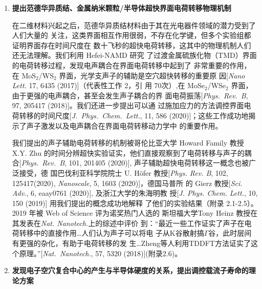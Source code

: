 \documentclass[12pt,UTF8,AutoFakeBold=3,a4paper]{article}
\newcommand{\hnamd}{Hefei-NAMD}
\begin{document}
\begin{enumerate}[label=\textnormal{\color{EmphColor}\Roman*.}]
\item {\color{EmphColor}\kaishu\bfseries{}
    提出范德华异质结、金属纳米颗粒/半导体超快界面电荷转移物理机制
}

  在二维材料兴起之后，范德华异质结材料由于其在光电器件领域的潜力受到了人们大量的
  关注，这类界面相互作用很弱，不存在化学键，但多个实验组都证明界面存在时间尺度在
  数十飞秒的超快电荷转移，这其中的物理机制人们还无法理解。我们利用 \hnamd{} 研究
  了过渡金属硫族化物（TMD）界面的电荷转移过程，发现电声耦合在界面电荷转移中起到了
  非常重要的作用，在 MoS$_2$/WS$_2$ 界面，光学支声子的辅助是空穴超快转移的重要原
  因[\textit{Nano Lett.} 17, 6435 (2017)]（代表性工作 2，引
  用 70次）,在 MoSe$_2$/WSe$_2$ 界面，由于更强的电声耦合，甚至会发生声子耦合的界
  面电荷振荡[\textit{Phys.\ Rev.\ B}, 97, 205417 (2018)]。我们还进一步提出可以通
  过施加应力的方法调控界面电荷转移的时间尺度[\textit{J.\ Phys.\ Chem.\ Lett.},
  11, 586 (2020)]；这些工作成功地揭示了声子激发以及电声耦合在界面电荷转移动力学中
  的重要作用。

  \begin{justify} \kaishu\color{magenta}{}

    我们提出的声子辅助电荷转移的机制被哥伦比亚大学 Howard Family 教授 X.Y.  Zhu
    的时间分辨超快实验证实，他们直接观察到了电荷转移与声子的耦合[\textit{Phys.\
      Rev.\ B}, 101, 201405 (2020)], 声子辅助超快电荷转移这一概念也被广泛接受，德
    国巴伐利亚科学院院士 U.  H\"ofer 教授[\textit{Phys. Rev. B}, 102,
    125417(2020), \textit{Nanoscale}, 5, 1603 (2020)]，德国马普所
    的 Gierz 教授[\textit{Sci. Adv.}, 6, eaay0761 (2020)], 及浙江大学的朱海明教
    授[\textit{J. Phys. Chem. Lett.}, 10, 150 (2019)] 用我们提出的概念成功地解释
    了他们的实验结果（附录 2.1-2.5）。2019 年被 Web of Science 评为诺奖热门人选的
    斯坦福大学Tony Heinz 教授在其发表在\textit{Nat. Nanotech.}上的综述中评价
    到：“最近一些工作证实了声子在电荷转移中的直接作用\ldots{}人们认为声子可以将电
    子从K谷散射搞$\Gamma$谷，此时层间有更强的杂化，有助于电荷转移的发
    生\ldots{}Zheng等人利用TDDFT方法证实了这个原理。”[\textit{Nat.\ Nanotech.},
    57, 5320 (2018)](附录2.6)。
  \end{justify}

  
\item {\color{EmphColor}\kaishu\bfseries{}
    发现电子空穴复合中心的产生与半导体硬度的关系，提出调控载流子寿命的理论方案
  }


\end{enumerate}
\end{document}
